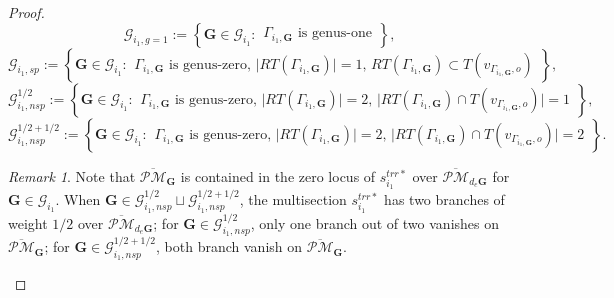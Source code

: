 \documentclass[11pt]{amsart}
\theoremstyle{definition}
\theoremstyle{remark}
\newtheorem{rmk}[dummy]{Remark}
\newcommand{\oPMb}{{\overline{\mathcal{PM}}}}
\newcommand{\nontilde}{}
\newcommand{\<}{\left<}
\renewcommand{\>}{\right>}
\numberwithin{equation}{section}
\begin{document}
\begin{proof}
\begin{equation*}
             \bm{\mathcal G}^{}_{i_1,g=1}:=\left\{ \bm{G}\in \bm{\mathcal G}_{i_1} \colon  \begin{array}{c} \text{$\Gamma_{i_1,\bm{G}}$ is genus-one}
             \end{array}\right\},
        \end{equation*}
     \begin{equation*}
             \bm{\mathcal G}^{}_{i_1,sp}:=\left\{ \bm{G}\in \bm{\mathcal G}_{i_1} \colon  \begin{array}{c} \text{$\Gamma_{i_1,\bm{G}}$ is genus-zero, $\lvert RT(\Gamma_{i_1,\bm{G}})\rvert=1$, $RT(\Gamma_{i_1,\bm{G}}) \subset T(v_{\Gamma_{i_1,\bm{G}},o})$}
             \end{array}\right\},
        \end{equation*}
        \begin{equation*}
             \bm{\mathcal G}^{1/2}_{i_1,nsp}:=\left\{ \bm{G}\in \bm{\mathcal G}_{i_1} \colon  \begin{array}{c} \text{$\Gamma_{i_1,\bm{G}}$ is genus-zero, $\lvert RT(\Gamma_{i_1,\bm{G}})\rvert=2$, $\lvert RT(\Gamma_{i_1,\bm{G}}) \cap T(v_{\Gamma_{i_1,\bm{G}},o})\rvert=1$}
             \end{array}\right\},
        \end{equation*}
        \begin{equation*}
             \bm{\mathcal G}^{1/2+1/2}_{i_1,nsp}:=\left\{ \bm{G}\in \bm{\mathcal G}_{i_1} \colon  \begin{array}{c} \text{$\Gamma_{i_1,\bm{G}}$ is genus-zero, $\lvert RT(\Gamma_{i_1,\bm{G}})\rvert=2$, $\lvert RT(\Gamma_{i_1,\bm{G}}) \cap T(v_{\Gamma_{i_1,\bm{G}},o})\rvert=2$}
             \end{array}\right\}.
        \end{equation*}
        
        \begin{rmk}\label{rmk on zero locus of the single global trr of Lstar}
            Note %
that $\oPMb_{\bm{G}}$ is contained in the zero locus of  $\nontilde{s}^{trr*}_{i_1}$ over $\oPMb_{d_e\bm{G}}$ for $\bm{G}\in \bm{\mathcal G}_{i_1}$. 
             When $\bm{G}\in \bm{\mathcal G}^{1/2}_{i_1,nsp} \sqcup \bm{\mathcal G}^{1/2+1/2}_{i_1,nsp}$, the multisection             $\nontilde{s}^{trr*}_{i_1}$  has two branches of weight $1/2$ over $\oPMb_{d_e\bm{G}}$; for $\bm{G}\in \bm{\mathcal G}^{1/2}_{i_1,nsp}$, only one branch out of two vanishes on $\oPMb_{\bm{G}}$; for $\bm{G}\in  \bm{\mathcal G}^{1/2+1/2}_{i_1,nsp}$, both branch vanish on $\oPMb_{\bm{G}}$. 
        \end{rmk}


\end{proof}
\end{document}
